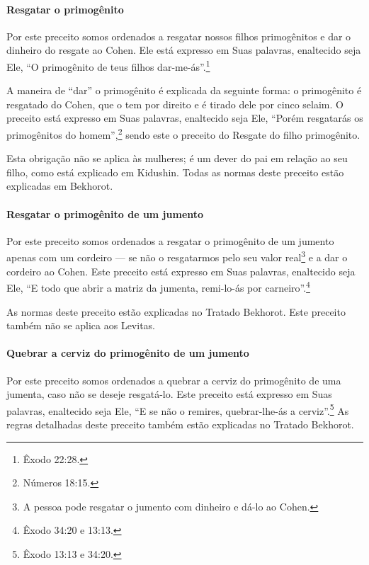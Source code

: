 \paragraph{Resgatar o primogênito}

Por este preceito somos ordenados a resgatar nossos filhos primogênitos
e dar o dinheiro do resgate ao Cohen. Ele está expresso em Suas
palavras, enaltecido seja Ele, ``O primogênito de teus filhos dar-me-ás''.\footnote{Êxodo 22:28.}

A maneira de ``dar'' o primogênito é explicada da seguinte forma: o
primogênito é resgatado do Cohen, que o tem por direito e é tirado
dele por cinco selaim.\starr{} O preceito está expresso em Suas palavras, enaltecido seja Ele, ``Porém
resgatarás os primogênitos do homem'',\footnote{Números 18:15.} sendo este o
preceito do Resgate do filho primogênito.

Esta obrigação não se aplica às mulheres; é um dever do pai em relação
ao seu filho, como está explicado em Kidushin. Todas as normas deste
preceito estão explicadas em Bekhorot.

\paragraph{Resgatar o primogênito de um jumento}

Por este preceito somos ordenados a resgatar o primogênito de um jumento
apenas com um cordeiro --- se não o resgatarmos pelo seu valor
real\footnote{A pessoa pode resgatar o jumento com dinheiro e dá-lo ao Cohen.} e a dar o cordeiro ao Cohen. Este
preceito está expresso em Suas palavras,
enaltecido seja Ele, ``E todo que abrir a matriz da jumenta, remi-lo-ás
por carneiro''.\footnote{Êxodo 34:20 e 13:13.}

As normas deste preceito estão explicadas no Tratado Bekhorot. Este
preceito também não se aplica aos Levitas.

\paragraph{Quebrar a cerviz do primogênito de um jumento}

Por este preceito somos ordenados a quebrar a cerviz do primogênito de
uma jumenta, caso não se deseje resgatá-lo. Este preceito está expresso
em Suas palavras, enaltecido seja Ele, ``E se não o remires,
quebrar-lhe-ás a cerviz''.\footnote{Êxodo 13:13 e 34:20.} As regras detalhadas
deste preceito também estão explicadas no Tratado Bekhorot.

